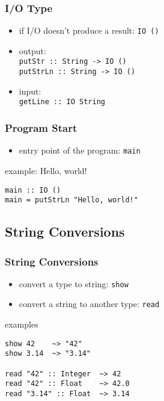 \documentclass[dvipsnames]{beamer}
\theoremstyle{plain}
\begin{document}
\begin{frame}
  \frametitle{I/O Type}

  \begin{itemize}
    \item if I/O doesn't produce a result: \lstinline|IO ()|

    \medskip
    \item output:\\
      \smallskip
      \lstinline|putStr :: String -> IO ()|\\
      \lstinline|putStrLn :: String -> IO ()|

    \smallskip
    \item input:\\
      \smallskip
      \lstinline|getLine :: IO String|\\
  \end{itemize}
\end{frame}

\begin{frame}[fragile]
  \frametitle{Program Start}

  \begin{itemize}
    \item entry point of the program: \lstinline|main|
  \end{itemize}

  \medskip
  \begin{exampleblock}{example: Hello, world!}
    \begin{lstlisting}
main :: IO ()
main = putStrLn "Hello, world!"
    \end{lstlisting}
  \end{exampleblock}
\end{frame}

\subsection{String Conversions}

\begin{frame}[fragile]
  \frametitle{String Conversions}

  \begin{itemize}
    \item convert a type to string: \lstinline|show|
    \item convert a string to another type: \lstinline|read|
  \end{itemize}

  \begin{exampleblock}{examples}
    \begin{lstlisting}
show 42    ~> "42"
show 3.14  ~> "3.14"

read "42" :: Integer  ~> 42
read "42" :: Float    ~> 42.0
read "3.14" :: Float  ~> 3.14
    \end{lstlisting}
  \end{exampleblock}
\end{frame}
\end{document}
